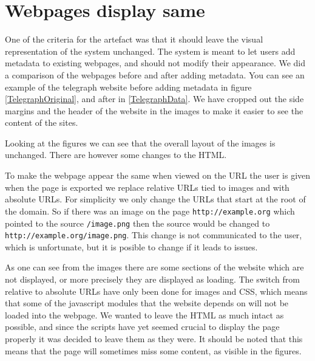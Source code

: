 
\section{Webpages display same}
One of the criteria for the artefact was that it should leave the visual representation of the system unchanged.
The system is meant to let users add metadata to existing webpages, and should not modify their appearance.
We did a comparison of the webpages before and after adding metadata.
You can see an example of the telegraph website before adding metadata in figure \ref{TelegraphOriginal},
and after in \ref{TelegraphData}.
We have cropped out the side margins and the header of the website in the images to make it easier to see the content of the sites.


Looking at the figures we can see that the overall layout of the images is unchanged.
There are however some changes to the HTML.

To make the webpage appear the same when viewed on the URL the user is given when the page is exported
we replace relative URLs tied to images and  with absolute URLs.
For simplicity we only change the URLs that start at the root of the domain.
So if there was an image on the page \texttt{http://example.org} which pointed to the source \texttt{/image.png}
then the source would be changed to \texttt{http://example.org/image.png}.
This change is not communicated to the user, which is unfortunate,
but it is posible to change if it leads to issues.

As one can see from the images there are some sections of the website which are not displayed, or more precisely they
are displayed as loading.
The switch from relative to absolute URLs have only been done for images and CSS,
which means that some of the javascript modules that the website depends on will not be loaded into the webpage.
We wanted to leave the HTML as much intact as possible,
and since the scripts have yet seemed crucial to display the page properly it was decided to leave them as they were.
It should be noted that this means that the page will sometimes miss some content, as visible in the figures.

